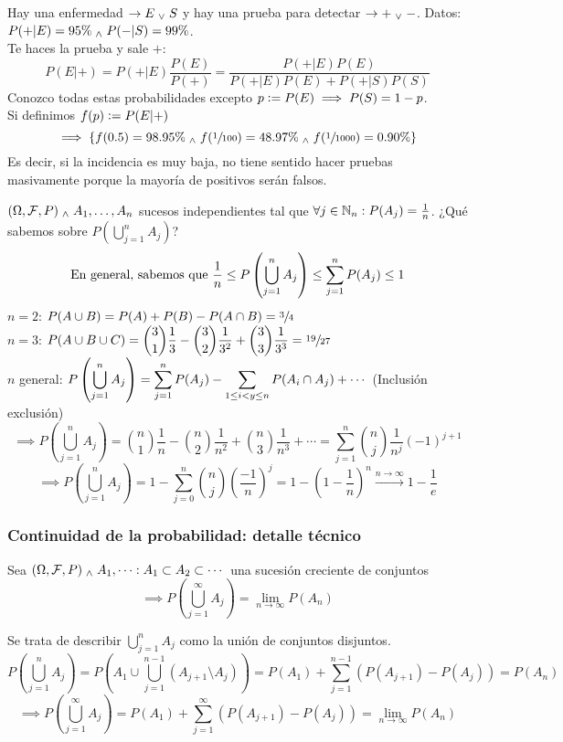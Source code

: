 \begin{ejem}
	Hay una enfermedad $\rightarrow E \; _{\vee} \; S$ y hay una prueba para detectar $\rightarrow + \; _{\vee} \; -$. Datos: $P(+ | E)=95\% \; _{\wedge} \; P(-| S)=99\%$.\\
	Te haces la prueba y sale $+$:
	\[P(E|+)=P(+|E)\frac{P(E)}{P(+)}=\frac{P(+|E)P(E)}
	{P(+|E)P(E)+P(+|S)P(S)}\]
	Conozco todas estas probabilidades excepto $p\vcentcolon= P(E) \implies P(S)=1-p$.\\
	Si definimos $f(p)\vcentcolon= P(E|+)$ \[\implies \{f(0.5)=98.95\% \; _{\wedge} \; f(\sfrac{1}{100}) = 48.97\%\; _{\wedge} \; f(\sfrac{1}{1000}) = 0.90\% \}\]
	Es decir, si la incidencia es muy baja, no tiene sentido hacer pruebas masivamente porque la mayoría de positivos serán falsos.
\end{ejem}
 \begin{ejem}
	 $(\Omega, \mathcal{F}, P) \; _{\wedge} \; A_1, \dots, A_n$ sucesos independientes tal que $\forall j \in \mathbb{N}_n : P(A_j)=\frac{1}{n}$. ¿Qué sabemos sobre $P\left(\bigcup_{j=1}^n A_j\right)$?
	 \[\text{En general, sabemos que } \frac{1}{n}\leq P\left(\bigcup_{j=1}^n A_j\right) \leq \sum_{j=1}^nP(A_j)\leq 1\]
	 $n=2$: $\displaystyle P(A\cup B)=P(A)+P(B)-P(A\cap B)=\sfrac{3}{4}$ \\
	 $n=3$: $\displaystyle P(A\cup B\cup C)=\binom{3}{1}\frac{1}{3}-\binom{3}{2}\frac{1}{3^2}+\binom{3}{3}\frac{1}{3^3}=\sfrac{19}{27}$ \\
	 $n$ general: $\displaystyle P\left(\bigcup_{j=1}^n A_j\right)=\sum_{j=1}^nP(A_j)-\sum_{1\leq i<y\leq n} P(A_i\cap A_j) + \cdots$ (Inclusión exclusión)
	 \[\implies P\left(\bigcup_{j=1}^n A_j\right)= \binom{n}{1}\frac{1}{n} - \binom{n}{2}\frac{1}{n^2} + \binom{n}{3}\frac{1}{n^3} + \cdots=\sum_{j=1}^n\binom{n}{j}\frac{1}{n^j}(-1)^{j+1}\]
	 \[\implies P\left(\bigcup_{j=1}^n A_j\right)= 1-\sum_{j=0}^n\binom{n}{j}\left(\frac{-1}{n}\right)^j=1-\left(1-\frac{1}{n}\right)^n\xrightarrow{n\rightarrow\infty}1-\frac{1}{e}\]
 \end{ejem}

 \subsubsection{Continuidad de la probabilidad: detalle técnico}

\begin{prop}
	Sea $(\Omega, \mathcal{F}, P) \; _{\wedge} \; A_1, \dots : A_1 \subset A_2 \subset \cdots$ una sucesión creciente de conjuntos
	\[\implies P\left(\bigcup_{j=1}^\infty A_j\right)=\lim_{n\rightarrow\infty}P\left(A_n\right)\]
	\begin{dem}
		Se trata de describir $\bigcup_{j=1}^n A_j$ como la unión de conjuntos disjuntos.
		\[P\left(\bigcup_{j=1}^n A_j\right)=P\left(A_1\cup\bigcup_{j=1}^{n-1} \left(A_{j+1}\setminus A_j\right)\right)=P(A_1)+\sum_{j=1}^{n-1}\left(P(A_{j+1})-P(A_j)\right)=P(A_n)\]
		\[\implies P\left(\bigcup_{j=1}^\infty A_j\right) = P(A_1)+\sum_{j=1}^{\infty}\left(P(A_{j+1})-P(A_j)\right)=\lim_{n\rightarrow\infty}P(A_n)\]
	\end{dem}
\end{prop}

